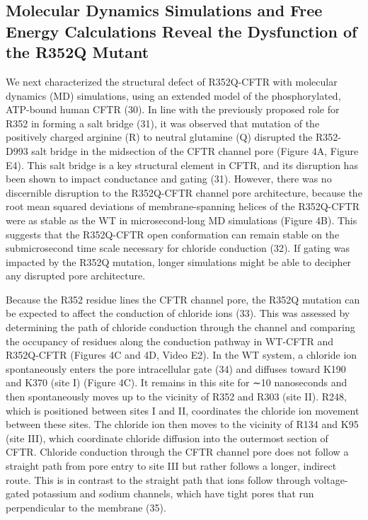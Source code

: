 \subsection{Molecular Dynamics Simulations and Free Energy Calculations Reveal the Dysfunction of the R352Q Mutant}


We next characterized the structural defect of R352Q-CFTR with molecular dynamics (MD) simulations, using an extended model of the phosphorylated, ATP-bound human CFTR (30). In line with the previously proposed role for R352 in forming a salt bridge (31), it was observed that mutation of the positively charged arginine (R) to neutral glutamine (Q) disrupted the R352-D993 salt bridge in the midsection of the CFTR channel pore (Figure 4A, Figure E4). This salt bridge is a key structural element in CFTR, and its disruption has been shown to impact conductance and gating (31). However, there was no discernible disruption to the R352Q-CFTR channel pore architecture, because the root mean squared deviations of membrane-spanning helices of the R352Q-CFTR were as stable as the WT in microsecond-long MD simulations (Figure 4B). This suggests that the R352Q-CFTR open conformation can remain stable on the submicrosecond time scale necessary for chloride conduction (32). If gating was impacted by the R352Q mutation, longer simulations might be able to decipher any disrupted pore architecture.

Because the R352 residue lines the CFTR channel pore, the R352Q mutation can be expected to affect the conduction of chloride ions (33). This was assessed by determining the path of chloride conduction through the channel and comparing the occupancy of residues along the conduction pathway in WT-CFTR and R352Q-CFTR (Figures 4C and 4D, Video E2). In the WT system, a chloride ion spontaneously enters the pore intracellular gate (34) and diffuses toward K190 and K370 (site I) (Figure 4C). It remains in this site for ∼10 nanoseconds and then spontaneously moves up to the vicinity of R352 and R303 (site II). R248, which is positioned between sites I and II, coordinates the chloride ion movement between these sites. The chloride ion then moves to the vicinity of R134 and K95 (site III), which coordinate chloride diffusion into the outermost section of CFTR. Chloride conduction through the CFTR channel pore does not follow a straight path from pore entry to site III but rather follows a longer, indirect route. This is in contrast to the straight path that ions follow through voltage-gated potassium and sodium channels, which have tight pores that run perpendicular to the membrane (35).

